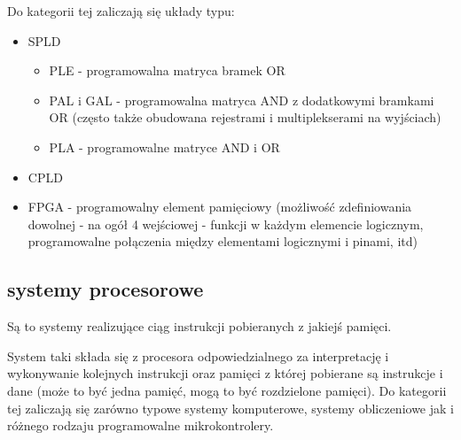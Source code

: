 \documentclass{pdfBooklets}
\begin{document}
Do kategorii tej zaliczają się układy typu:
\begin{itemize}
	\item SPLD
	\begin{itemize}
		\item PLE - programowalna matryca bramek OR
		\item PAL i GAL - programowalna matryca AND z dodatkowymi bramkami OR (często także obudowana rejestrami i multiplekserami na wyjściach)
		\item PLA - programowalne matryce AND i OR
	\end{itemize}
	\item CPLD
	\item FPGA - programowalny element pamięciowy (możliwość zdefiniowania dowolnej - na ogół 4 wejściowej - funkcji w każdym elemencie logicznym, programowalne połączenia między elementami logicznymi i pinami, itd)
\end{itemize}

\subsection{systemy procesorowe}
Są to systemy realizujące ciąg instrukcji pobieranych z jakiejś pamięci.

System taki składa się z procesora odpowiedzialnego za interpretację i wykonywanie kolejnych instrukcji oraz pamięci z której pobierane są instrukcje i dane (może to być jedna pamięć, mogą to być rozdzielone pamięci). Do kategorii tej zaliczają się zarówno typowe systemy komputerowe, systemy obliczeniowe jak i różnego rodzaju programowalne mikrokontrolery.
\end{document}
